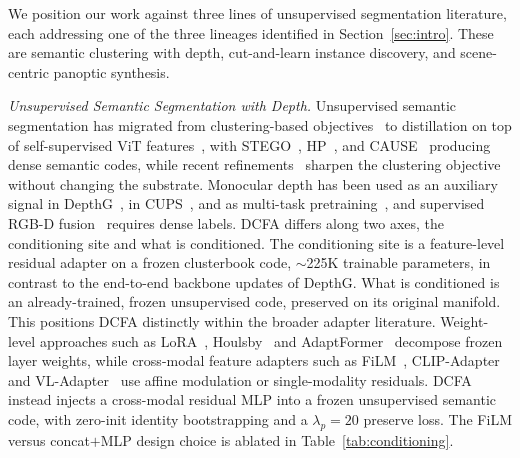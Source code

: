 \documentclass{article}
\renewcommand{\paragraph}[1]{\par\smallskip\noindent\textit{#1}\hspace{0.5em}\ignorespaces}
\begin{document}
We position our work against three lines of unsupervised segmentation literature, each addressing one of the three lineages identified in Section~\ref{sec:intro}. These are semantic clustering with depth, cut-and-learn instance discovery, and scene-centric panoptic synthesis.

\paragraph{Unsupervised Semantic Segmentation with Depth.}
Unsupervised semantic segmentation has migrated from clustering-based objectives~\cite{ji2019iic,cho2021picie} to distillation on top of self-supervised ViT features~\cite{caron2021dino,oquab2024dinov2}, with STEGO~\cite{hamilton2022stego}, HP~\cite{seong2023hp}, and CAUSE~\cite{kim2024cause} producing dense semantic codes, while recent refinements~\cite{kim2024eagle,seong2024ppap,couairon2024diffcut,bonnet2024hierarchy} sharpen the clustering objective without changing the substrate. Monocular depth has been used as an auxiliary signal in DepthG~\cite{sick2024depthg}, in CUPS~\cite{hahn2025cups}, and as multi-task pretraining~\cite{hoyer2021threeways}, and supervised RGB-D fusion~\cite{yin2025dformerv2} requires dense labels. DCFA differs along two axes, the conditioning site and what is conditioned. The conditioning site is a feature-level residual adapter on a frozen clusterbook code, $\sim$225K trainable parameters, in contrast to the end-to-end backbone updates of DepthG. What is conditioned is an already-trained, frozen unsupervised code, preserved on its original manifold. This positions DCFA distinctly within the broader adapter literature. Weight-level approaches such as LoRA~\cite{hu2022lora}, Houlsby~\cite{houlsby2019adapter} and AdaptFormer~\cite{chen2022adaptformer} decompose frozen layer weights, while cross-modal feature adapters such as FiLM~\cite{perez2018film}, CLIP-Adapter~\cite{gao2023clipadapter} and VL-Adapter~\cite{sung2022vladapter} use affine modulation or single-modality residuals. DCFA instead injects a cross-modal residual MLP into a frozen unsupervised semantic code, with zero-init identity bootstrapping and a $\lambda_p{=}20$ preserve loss. The FiLM versus concat$+$MLP design choice is ablated in Table~\ref{tab:conditioning}.
\end{document}
